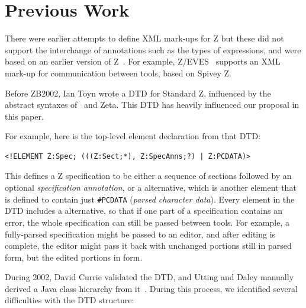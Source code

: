 \documentclass{llncs}  %
\newcommand{\Zeta}{Zeta}
\begin{document}
\section{Previous Work}

There were earlier attempts to define XML mark-ups for Z
\cite{Wordsworth99,Dong01} but these did not support the interchange of
annotations such as the types of expressions, and were based on an earlier
version of Z~\cite{spivey:z-notation2}. 
For example, Z/EVES~\cite{saaltink:zeves-system} supports an XML mark-up
for communication between tools, based on Spivey Z.

Before ZB2002, Ian Toyn wrote a DTD for Standard Z, influenced by the
abstract syntaxes of \CADiZ\ and \Zeta.  This DTD has heavily influenced our
proposal in this paper. 

For example, here is the top-level element declaration from that DTD:
\begin{small}
\begin{verbatim}
<!ELEMENT Z:Spec; (((Z:Sect;*), Z:SpecAnns;?) | Z:PCDATA)>
\end{verbatim}
\end{small}

This defines a Z specification to be either a sequence of sections
followed by an optional \emph{specification annotation}, or a
 alternative, which is another element that is defined 
to contain just \verb!#PCDATA! (\textit{parsed character data}).
Every element in the DTD includes a  alternative, so
that if one part of a specification contains an error, the whole
specification can still be passed between tools.  For example,
a fully-parsed specification might be passed to an editor, and after
editing is complete, the editor might pass it back with unchanged
portions still in parsed form, but the edited portions in 
form. 

During 2002, David Currie validated the DTD, and Utting and Daley
manually derived a Java class hierarchy from it~\cite{daley:report02}.
During this process, we identified several difficulties with the
DTD structure:
\end{document}

